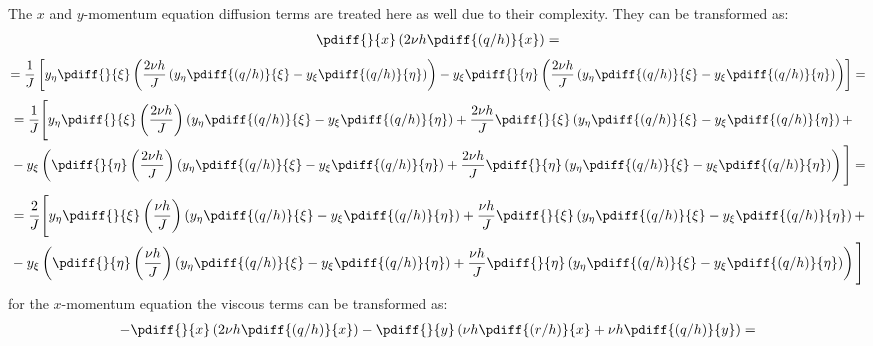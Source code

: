 The $x$ and $y$-momentum equation diffusion terms are treated here as well due to their complexity.
They can be transformed as:
	\begin{align}
		\pdiff{}{x}\left(2\nu h \pdiff{(q/h)}{x}\right) =
	\end{align}
	\begin{align}
		=\frac{1}{J} \left[
		y_{\eta}\pdiff{}{\xi}\left( \frac{2\nu h}{J} \left(
		y_{\eta}\pdiff{(q/h)}{\xi}
		- y_{\xi}\pdiff{(q/h)}{\eta}\right) \right)
		- y_{\xi}\pdiff{}{\eta}\left(\frac{2\nu h}{J} \left(
		y_{\eta}\pdiff{(q/h)}{\xi}
		-y_{\xi}\pdiff{(q/h)}{\eta} \right) \right) \right] =
	\end{align}
	\begin{align}
		\begin{aligned}
			&=\frac{1}{J} \Bigg[
			y_{\eta} \pdiff{}{\xi}\left( \frac{2\nu h}{J}\right) \left(
			y_{\eta}\pdiff{(q/h)}{\xi}
			- y_{\xi}\pdiff{(q/h)}{\eta}\right)
			+ \frac{2\nu h}{J} \pdiff{}{\xi} \left(
			y_{\eta}\pdiff{(q/h)}{\xi}
			- y_{\xi}\pdiff{(q/h)}{\eta}\right) +
            \\
			&- y_{\xi}\left(\pdiff{}{\eta} \left(\frac{2\nu h}{J}\right) \left(
			y_{\eta}\pdiff{(q/h)}{\xi}
			-y_{\xi}\pdiff{(q/h)}{\eta} \right)
			+\frac{2\nu h}{J} \pdiff{}{\eta}\left(
			y_{\eta}\pdiff{(q/h)}{\xi}
			-y_{\xi}\pdiff{(q/h)}{\eta} \right)
			\right) \Bigg] =
		\end{aligned}
	\end{align}
	\begin{align}
		\begin{aligned}
			&=\frac{2}{J} \Bigg[
			y_{\eta} \pdiff{}{\xi}\left( \frac{\nu h}{J}\right) \left(
			y_{\eta}\pdiff{(q/h)}{\xi}
			- y_{\xi}\pdiff{(q/h)}{\eta}\right)
			+ \frac{\nu h}{J} \pdiff{}{\xi} \left(
			y_{\eta}\pdiff{(q/h)}{\xi}
			- y_{\xi}\pdiff{(q/h)}{\eta}\right) +
            \\
			&- y_{\xi}\left(\pdiff{}{\eta} \left(\frac{\nu h}{J}\right) \left(
			y_{\eta}\pdiff{(q/h)}{\xi}
			-y_{\xi}\pdiff{(q/h)}{\eta} \right)
			+\frac{\nu h}{J} \pdiff{}{\eta}\left(
			y_{\eta}\pdiff{(q/h)}{\xi}
			-y_{\xi}\pdiff{(q/h)}{\eta} \right)
			\right) \Bigg]
		\end{aligned}
	\end{align}
%
for the $x$-momentum equation the viscous terms can be transformed as:
	\begin{align}
		\begin{aligned}
			- \pdiff{}{x}\left(2\nu h\pdiff{(q/h)}{x} \right)
			- \pdiff{}{y}\left(\nu h\pdiff{(r/h)}{x} + \nu h \pdiff{(q/h)}{y} \right) =
		\end{aligned}
	\end{align}
